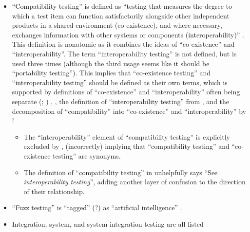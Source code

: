 \begin{itemize}
      \item ``Compatibility testing'' is defined as ``testing that measures the
            degree to which a test item can function satisfactorily alongside
            other independent products in a shared environment (co-existence),
            and where necessary, exchanges information with other systems or
            components (interoperability)'' \citep[p.~3]{IEEE2022}. This
            definition is nonatomic as it combines the ideas of ``co-existence''
            and ``interoperability''. The term ``interoperability testing'' is
            not defined, but is used three times \citep[pp.~22,~43]{IEEE2022}
            (although the third usage seems like it should be ``portability
            testing''). This implies that ``co-existence testing'' and
            ``interoperability testing'' should be defined as their own terms,
            which is supported by definitions of ``co-existence'' and
            ``interoperability'' often being separate
            \ifnotpaper
                  (\citealpISTQB{}; \citealp[pp.~73,~237]{IEEE2017})%
            \else
                  \cite[pp.~73,~237]{IEEE2017}, \cite{ISTQB}%
            \fi, the definition of
            ``interoperability testing'' from \citet[p.~238]{IEEE2017},
            and the decomposition of ``compatibility'' into ``co-existence''
            and ``interoperability'' by \citet{ISO_IEC2023a}!
            \begin{itemize}
                  \item The ``interoperability'' element of ``compatibility
                        testing'' is explicitly excluded by
                        \citet[p.~37]{IEEE2021}, (incorrectly) implying that
                        ``compatibility testing'' and ``co-existence testing''
                        are synonyms.
                  \item The definition of ``compatibility testing'' in
                        \citep[p.~43]{Kam2008} unhelpfully says ``See
                        \emph{interoperability testing}'', adding another
                        layer of confusion to the direction of their
                        relationship.
            \end{itemize}
            \ifnotpaper
      \item ``Fuzz testing'' is ``tagged'' (?) as ``artificial intelligence''
            \citep[p.~5]{IEEE2022}.
      \item Integration, system, and system integration testing are all listed

\end{itemize}
